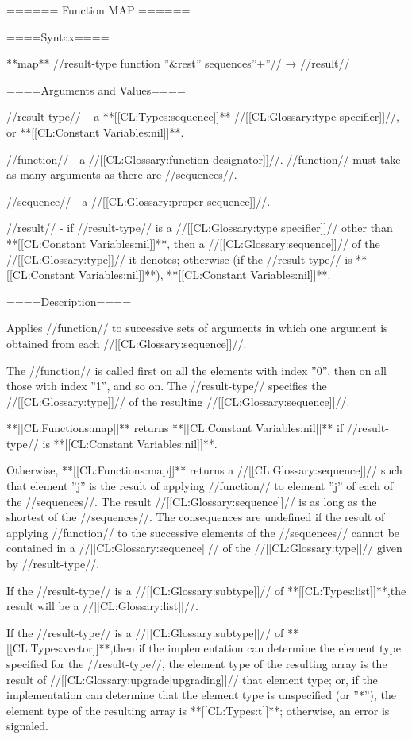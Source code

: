 ====== Function MAP ======

====Syntax====

**map** //result-type function ''&rest'' sequences''+''// → //result//

====Arguments and Values====

//result-type// -- a **[[CL:Types:sequence]]** //[[CL:Glossary:type specifier]]//, or **[[CL:Constant Variables:nil]]**.

//function// - a //[[CL:Glossary:function designator]]//. //function// must take as many arguments as there are //sequences//.

//sequence// - a //[[CL:Glossary:proper sequence]]//.

//result// - if //result-type// is a //[[CL:Glossary:type specifier]]// other than **[[CL:Constant Variables:nil]]**, then a //[[CL:Glossary:sequence]]// of the //[[CL:Glossary:type]]// it denotes; otherwise (if the //result-type// is **[[CL:Constant Variables:nil]]**), **[[CL:Constant Variables:nil]]**.

====Description====

Applies //function// to successive sets of arguments in which one argument is obtained from each //[[CL:Glossary:sequence]]//.

The //function// is called first on all the elements with index ''0'', then on all those with index ''1'', and so on. The //result-type// specifies the //[[CL:Glossary:type]]// of the resulting //[[CL:Glossary:sequence]]//.

**[[CL:Functions:map]]** returns **[[CL:Constant Variables:nil]]** if //result-type// is **[[CL:Constant Variables:nil]]**.

Otherwise, **[[CL:Functions:map]]** returns a //[[CL:Glossary:sequence]]// such that element ''j'' is the result of applying //function// to element ''j'' of each of the //sequences//. The result //[[CL:Glossary:sequence]]// is as long as the shortest of the //sequences//. The consequences are undefined if the result of applying //function// to the successive elements of the //sequences// cannot be contained in a //[[CL:Glossary:sequence]]// of the //[[CL:Glossary:type]]// given by //result-type//.

If the //result-type// is a //[[CL:Glossary:subtype]]// of **[[CL:Types:list]]**,the result will be a //[[CL:Glossary:list]]//.

If the //result-type// is a //[[CL:Glossary:subtype]]// of **[[CL:Types:vector]]**,then if the implementation can determine the element type specified for the //result-type//, the element type of the resulting array is the result of //[[CL:Glossary:upgrade|upgrading]]// that element type; or, if the implementation can determine that the element type is unspecified (or ''*''), the element type of the resulting array is **[[CL:Types:t]]**; otherwise, an error is signaled.

